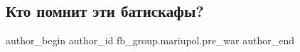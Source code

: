  
 
 
 
 

\subsection{Кто помнит эти батискафы?}
\label{sec:13_02_2023.fb.fb_group.mariupol.pre_war.8.kto_pomnit_eti_batis}

\ifcmt
 author_begin
   author_id fb_group.mariupol.pre_war
 author_end
\fi
